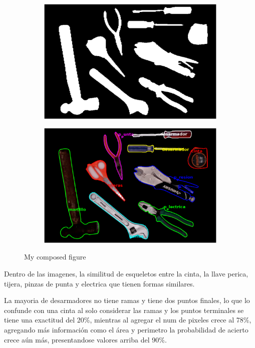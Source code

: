 \documentclass[a4paper, 11pt]{article}
\begin{document}
\begin{figure}[h]
  \begin{subfigure}{0.45\linewidth}
    \includegraphics[width=\linewidth]{paso9}
    \caption{}
    \label{fig:1a}
  \end{subfigure}\hfill
  \begin{subfigure}{0.45\linewidth}
    \includegraphics[width=\linewidth]{paso10}
    \caption{}
    \label{fig:1a}
  \end{subfigure}
  \caption{My composed figure}
  \label{fig:1}
\end{figure}


Dentro de las imagenes, la similitud de esqueletos entre la cinta, la llave perica, tijera, pinzas de punta y electrica que tienen formas similares.

La mayoria de desarmadores no tiene ramas y tiene dos puntos finales, lo que lo confunde con una cinta al solo considerar las ramas y los puntos terminales se tiene una exactitud del 20\%, mientras al agregar el num de pixeles crece al 78\%, agregando más información como el área y perimetro la probabilidad de acierto crece aún más, presentandose valores arriba del 90\%.
\pagebreak
\end{document}
